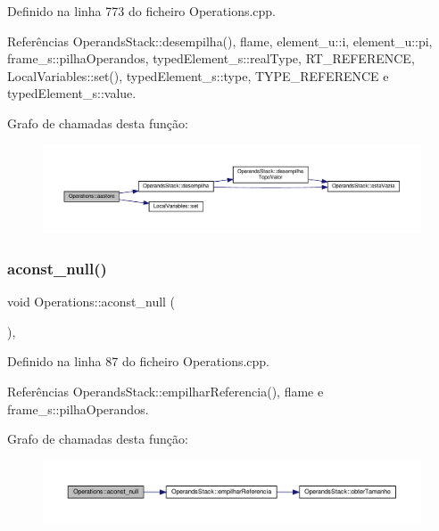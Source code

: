 Definido na linha 773 do ficheiro Operations.\+cpp.



Referências Operands\+Stack\+::desempilha(), flame, element\+\_\+u\+::i, element\+\_\+u\+::pi, frame\+\_\+s\+::pilha\+Operandos, typed\+Element\+\_\+s\+::real\+Type, R\+T\+\_\+\+R\+E\+F\+E\+R\+E\+N\+CE, Local\+Variables\+::set(), typed\+Element\+\_\+s\+::type, T\+Y\+P\+E\+\_\+\+R\+E\+F\+E\+R\+E\+N\+CE e typed\+Element\+\_\+s\+::value.

Grafo de chamadas desta função\+:
\nopagebreak
\begin{figure}[H]
\begin{center}
\leavevmode
\includegraphics[width=350pt]{classOperations_a60b30bd84b2d59334e735f0adda6febe_cgraph}
\end{center}
\end{figure}
\mbox{\label{classOperations_af51ec8a98d9ed3167da0d8ac6279a1cd}} 
\subsubsection{\texorpdfstring{aconst\+\_\+null()}{aconst\_null()}}
{\footnotesize\ttfamily void Operations\+::aconst\+\_\+null (\begin{DoxyParamCaption}{ }\end{DoxyParamCaption})\hspace{0.3cm}{\ttfamily [static]}, {\ttfamily [private]}}



Definido na linha 87 do ficheiro Operations.\+cpp.



Referências Operands\+Stack\+::empilhar\+Referencia(), flame e frame\+\_\+s\+::pilha\+Operandos.

Grafo de chamadas desta função\+:
\nopagebreak
\begin{figure}[H]
\begin{center}
\leavevmode
\includegraphics[width=350pt]{classOperations_af51ec8a98d9ed3167da0d8ac6279a1cd_cgraph}
\end{center}
\end{figure}
\mbox{\label{classOperations_a2f5c13146658e71de665c3b32ebed8c9}} 
